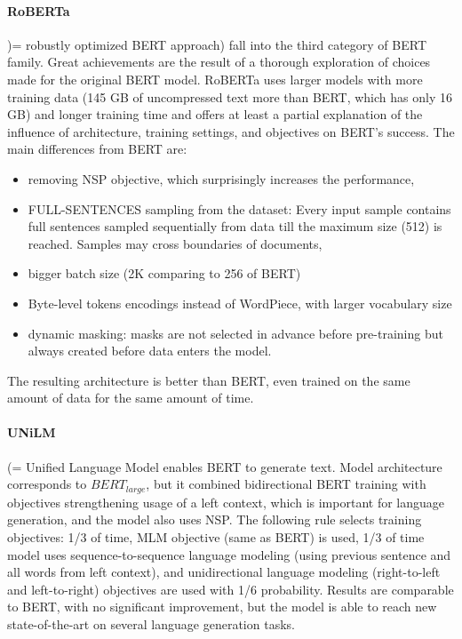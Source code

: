 \paragraph{RoBERTa} )= robustly optimized BERT approach) \citep{Liu2019} fall into the third category of BERT family. Great achievements are the result of a thorough exploration of choices made for the original BERT model. RoBERTa uses larger models with more training data (145 GB of uncompressed text more than BERT, which has only 16 GB) and longer training time and offers at least a partial explanation of the influence of architecture, training settings, and objectives on BERT's success. The main differences from BERT are:
\begin{itemize}
\item removing NSP objective, which surprisingly increases the performance,
\item FULL-SENTENCES sampling from the dataset: Every input sample contains full sentences sampled sequentially from data till the maximum size (512) is reached.  Samples may cross boundaries of documents,
\item bigger batch size (2K comparing to 256 of BERT)
\item Byte-level tokens encodings instead of WordPiece, with larger vocabulary size
\item dynamic masking: masks are not selected in advance before pre-training but always created before data enters the model.
\end{itemize}
The resulting architecture is better than BERT, even trained on the same amount of data for the same amount of time.
\paragraph{UNiLM} (= Unified Language Model \citep{Dong2019} enables BERT to generate text. Model architecture corresponds to $BERT_{large}$, but it combined bidirectional BERT training with objectives strengthening usage of a left context, which is important for language generation, and the model also uses NSP. The following rule selects training objectives: 1/3 of time, MLM objective (same as BERT) is used, 1/3 of time model uses sequence-to-sequence language modeling (using previous sentence and all words from left context), and unidirectional language modeling (right-to-left and left-to-right) objectives are used with 1/6 probability. Results are comparable to BERT, with no significant improvement, but the model is able to reach new state-of-the-art on several language generation tasks.

